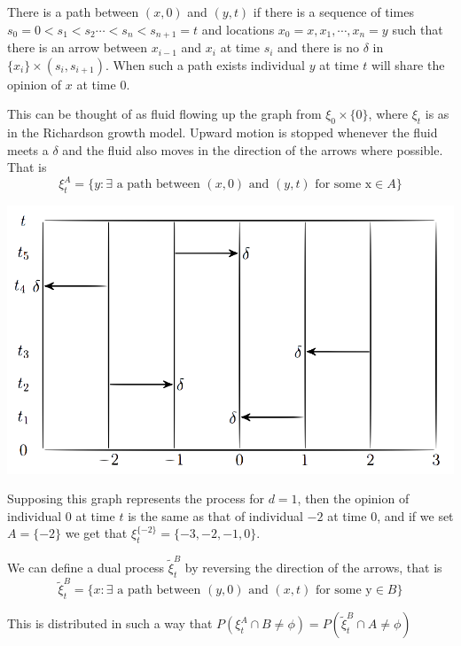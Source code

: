 \documentclass[11pt,a2paper,landscape]{article}
\newcommand\BoX[2]{\begin{minipage}{#1\textwidth}#2\end{minipage}}
\newcommand\sidebyside[2]{\BoX{.485}{#1}\BoX{.485}{#2}}
\begin{document}
\begin{multicols*}{3}
{There is a path between $(x,0)$ and $(y,t)$ if there is a sequence of times 
$s_{0}=0<s_{1}<s_{2} \cdots <s_{n}< s_{n+1}=t$ and locations $x_{0}=x,x_{1}, \cdots, x_{n}=y$ 
such that there is an arrow between $x_{i-1}$ and $x_{i}$ at time $s_{i}$ and there is no $\delta$ in 
$\{x_{i}\}\times(s_{i},s_{i+1})$. When such a path exists individual $y$ at time $t$ will share the opinion 
of $x$ at time $0$. 
\vspace{1ex}

This can be thought of as fluid flowing up the graph from $\xi_{0}\times \{0\}$, where
$\xi_{t}$ is as in the Richardson growth model. 
Upward motion is stopped whenever the fluid meets a $\delta$ and the fluid also moves in the direction 
of the arrows where possible. That is $$\xi_{t}^{A} = \{y: \exists \mbox{ a path between } (x,0) \mbox{ and } 
(y,t) \mbox{ for some x} \in A\}$$

\sidebyside{
\begin{center}
\includegraphics[scale=0.2]{vcon.png}
\end{center}}
{\vspace{1ex}Supposing this graph represents the process for $d=1$, then
the opinion of individual $0$ at time $t$ is the same as that of individual $-2$ 
at time $0$, and if we set $A=\{-2\}$ we get that $\xi_{t}^{\{-2\}}=\{-3,-2,-1,0\}$.

We can define a dual process $\tilde{\xi}_{t}^{B}$ by reversing the direction of 
the arrows, that is
\vspace{-2ex}
$$\tilde{\xi}_{t}^{B} = \{ x:\exists \mbox{ a path between }(y,0)\mbox{ and }(x,t)\mbox{ for some y} \in B\}$$

\vspace{-2ex}
This is distributed in such a way that $P(\xi_{t}^{A}\cap B \neq \phi) = 
P(\tilde{\xi}_{t}^{B} \cap A \neq \phi)$
}

}
\end{multicols*}
\end{document}
